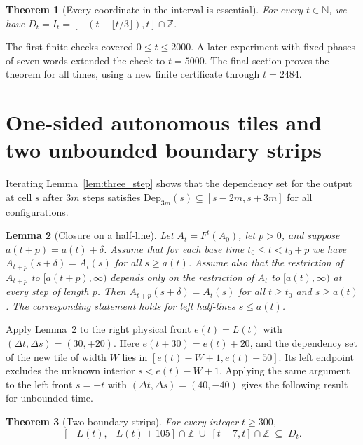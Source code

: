 \documentclass[11pt, a4paper]{article}
\newtheorem{theorem}{Theorem}[section]
\newtheorem{lemma}[theorem]{Lemma}
\begin{document}
\begin{theorem}[Every coordinate in the interval is essential]\label{conj:gap_free}
For every $t \in \mathbb{N}$, we have $D_t = I_t = [-(t - \lfloor t/3 \rfloor), t] \cap \mathbb{Z}$.
\end{theorem}

The first finite checks covered $0\le t\le2000$. A later experiment with fixed phases of seven words extended the check to $t=5000$. The final section proves the theorem for all times, using a new finite certificate through $t=2484$.

\section{One-sided autonomous tiles and two unbounded boundary strips}

Iterating Lemma~\ref{lem:three_step} shows that the dependency set for the output at cell $s$ after $3m$ steps satisfies $\mathrm{Dep}_{3m}(s) \subseteq [s - 2m, s + 3m]$ for all configurations.

\begin{lemma}[Closure on a half-line]\label{lem:one_sided}
Let $A_t = F^t(A_0)$, let $p > 0$, and suppose $a(t + p) = a(t) + \delta$. Assume that for each base time $t_0 \le t < t_0 + p$ we have $A_{t+p}(s + \delta) = A_t(s)$ for all $s \ge a(t)$. Assume also that the restriction of $A_{t+p}$ to $[a(t+p), \infty)$ depends only on the restriction of $A_t$ to $[a(t), \infty)$ at every step of length $p$. Then $A_{t+p}(s + \delta) = A_t(s)$ for all $t \ge t_0$ and $s \ge a(t)$. The corresponding statement holds for left half-lines $s \le a(t)$.
\end{lemma}

Apply Lemma~\ref{lem:one_sided} to the right physical front $e(t) = L(t)$ with $(\Delta t, \Delta s) = (30, +20)$. Here $e(t+30) = e(t) + 20$, and the dependency set of the new tile of width $W$ lies in $[e(t) - W + 1, e(t) + 50]$. Its left endpoint excludes the unknown interior $s < e(t) - W + 1$. Applying the same argument to the left front $s = -t$ with $(\Delta t, \Delta s) = (40,-40)$ gives the following result for unbounded time.

\begin{theorem}[Two boundary strips]\label{thm:dual_strips}
For every integer $t \ge 300$,
\begin{equation}\label{eq:dual_strips}
[-L(t), -L(t) + 105] \cap \mathbb{Z} \;\cup\; [t - 7, t] \cap \mathbb{Z} \;\subseteq\; D_t.
\end{equation}
\end{theorem}
\end{document}
